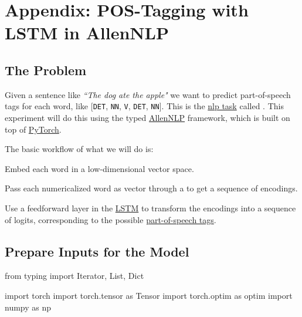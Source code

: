 \section{Appendix: POS-Tagging with LSTM in AllenNLP}\label{app:LSTMPOSTagger}


\subsection{The Problem}

Given a sentence like \textit{``The dog ate the apple"} we want to predict part-of-speech tags for each word, like [\texttt{DET}, \texttt{NN}, \texttt{V}, \texttt{DET}, \texttt{NN}]. This is the \hyperref[app:Appendix_NLPTasks]{nlp task} called . This experiment will do this using the typed \href{https://allennlp.org/}{AllenNLP} framework, which is built on top of \href{https://pytorch.org/tutorials/}{PyTorch}. 

The basic workflow of what we will do is: 

\begin{enumerateSpaced}{3pt}

\vspace{5pt}

    \item Embed each word in a low-dimensional vector space.
    
    \item Pass each numericalized word as vector through a  to get a sequence of encodings.
    
    \item Use a feedforward layer in the \hyperref[sec:LSTM]{LSTM} to transform the encodings into a sequence of logits, corresponding to the possible \hyperref[nlptask:postagging]{part-of-speech tags}.
\end{enumerateSpaced}


\subsection{Prepare Inputs for the Model}


\begin{pythonCode}

from typing import Iterator, List, Dict

import torch
import torch.tensor as Tensor
import torch.optim as optim
import numpy as np

\end{pythonCode}


